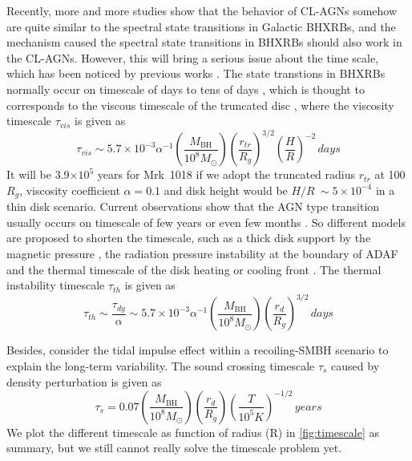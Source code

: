 \documentclass[twocolumn]{aastex63}
\begin{document}
Recently, more and more studies show that the behavior of CL-AGNs somehow are quite similar to the spectral state transitions in Galactic BHXRBs, and the mechanism caused the spectral state transitions in BHXRBs should also work in the CL-AGNs. However, this will bring a serious issue about the time scale, which has been noticed by previous works \citep[e.g. ][]{2018NatAs...2..102L,2018ApJ...864...27S,2018MNRAS.480.3898N,2020MNRAS.492.2335L}. The state transtions in BHXRBs normally occur on timescale of days to tens of days \citep{2009ApJ...701.1940Y,2010MNRAS.403...61D}, which is thought to corresponds to the viscous timescale of the truncated disc \citep[see reviews in ][]{2007A&ARv..15....1D}, where the viscosity timescale $\tau_{vis}$ is given as
\begin{equation}
\tau_{vis} \sim 5.7\times 10^{-3} \alpha^{-1}(\frac{M_\mathrm{BH}}{10^8M_{\odot}})(\frac{r_{tr}}{R_g})^{3/2} (\frac{H}{R})^{-2} \, days
\end{equation} It will be 3.9$\times 10^5$ years for Mrk~1018 if we adopt the truncated radius $r_{tr}$ at 100 $R_g$, viscosity coefficient $\alpha=0.1$ and disk height would be $H/R~\sim 5\times10^{-4}$ \citep[see also][]{2018MNRAS.480.3898N} in a thin disk scenario. Current observations show that the AGN type transition usually occurs on timescale of few years \citep[e.g.][]{2016A&A...593L...8M,2018ApJ...864...27S,2019MNRAS.483L..88P,2020MNRAS.492.2335L} or even few months \citep{2019ApJ...883...94T}. So different models are proposed to shorten the timescale, such as a thick disk support by the magnetic pressure \citep{2019MNRAS.483L..17D}, the radiation pressure instability at the boundary of ADAF \citep{2019arXiv190406767S} and the thermal timescale of the disk heating or cooling front \citep{2018ApJ...864...27S}. The thermal instability timescale $\tau_{th}$ is given as
\begin{equation}
\tau_{th} \sim \frac{\tau_{dy}}{\alpha} \sim 5.7\times 10^{-3} \alpha^{-1}(\frac{M_\mathrm{BH}}{10^8M_{\odot}})(\frac{r_d}{R_g})^{3/2} \, days
\end{equation}

Besides, \citet{2018ApJ...861...51K} consider the tidal impulse effect within a recoiling-SMBH scenario to explain the long-term variability. The sound crossing timescale $\tau_{s}$ caused by density perturbation is given as
\begin{equation}
\tau_{s}= 0.07 (\frac{M_\mathrm{BH}}{10^8M_{\odot}})(\frac{r_d}{R_g}) (\frac{T}{10^5 K})^{-1/2} \, years
\end{equation}  We plot the different timescale as function of radius (R) in \autoref{fig:timescale} as summary, but we still cannot really solve the timescale problem yet. 
\end{document}
